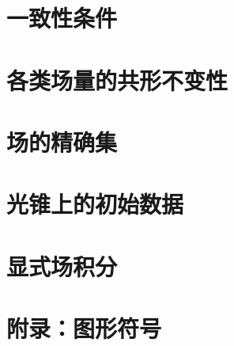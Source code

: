 \documentclass[utf8]{ctexbook}
\numberwithin{equation}{section}
\begin{document}
\section{一致性条件}
\section{各类场量的共形不变性}
\section{场的精确集}
\section{光锥上的初始数据}
\section{显式场积分}
\section*{附录：图形符号}
\end{document}
